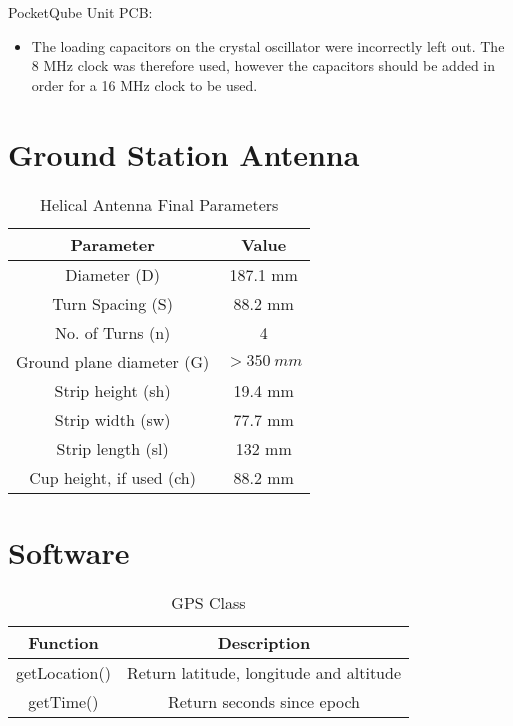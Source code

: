 \noindent PocketQube Unit PCB:
\begin{itemize}
  \item The loading capacitors on the crystal oscillator were incorrectly left out. The 8 MHz clock was therefore used, however the capacitors should be added in order for a 16 MHz clock to be used.
\end{itemize}

\section{Ground Station Antenna}
\begin{table}[!htb]
  \centering
  \renewcommand{\arraystretch}{1.2}
  \begin{tabular}{ |c|c| }
  \hline
  \textbf{Parameter}                  & \textbf{Value}    \\
  \hline
  Diameter (D)                        & 187.1 mm          \\ \hline
  Turn Spacing (S)                    & 88.2 mm           \\ \hline
  No. of Turns (n)                    & 4                 \\ \hline
  Ground plane diameter (G)           & $> \SI{350}{mm}$  \\ \hline
  Strip height (sh)                   & 19.4 mm          \\ \hline
  Strip width (sw)                    & 77.7 mm           \\ \hline
  Strip length (sl)                   & 132 mm           \\ \hline
  Cup height, if used (ch)            & 88.2 mm           \\ \hline
  \end{tabular}
  \caption{Helical Antenna Final Parameters}
  \label{tab:helicalParameters}
\end{table}

\newpage
\section{Software}
\begin{table}[!htb]
  \centering
  \caption{GPS Class}
  \renewcommand{\arraystretch}{1.2}
  \begin{tabular}{ |c|c| }
  \hline
  \textbf{Function}        & \textbf{Description}    \\
  \hline
    getLocation()              & Return latitude, longitude and altitude \\
    getTime()                  & Return seconds since epoch \\
  \hline
  \end{tabular}
  \label{tab:gpsUML}
\end{table}

